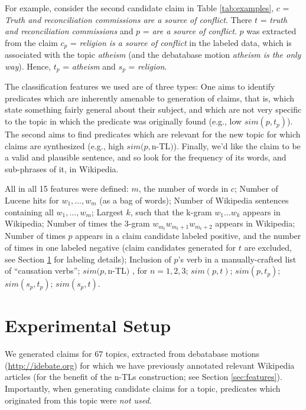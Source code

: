 \documentclass[11pt]{article}
\begin{document}
For example, consider the second candidate claim in Table \ref{tab:examples}, $c$ = \textit{Truth and reconciliation commissions are a source of conflict}. There $t$ = \textit{truth and reconciliation commissions} and $p$ = \textit{are a source of conflict}. $p$ was extracted from the claim $c_p$ = \textit{religion is a source of conflict} in the labeled data, which is associated with the topic \textit{atheism} (and the debatabase motion \textit{atheism is the only way}). Hence, $t_p$ = \textit{atheism} and $s_p$ = \textit{religion}. 

The classification features we used are of three types: One aims to identify predicates which are inherently 
amenable to generation of claims, that is, which state something fairly general about their subject, 
and which are not very specific to the topic in which the predicate was originally found %
(e.g., low $sim(p, t_p)$). The second aims to find predicates which are relevant for the new topic for which claims are synthesized %
(e.g., high $sim(p,$n-TL$)$). Finally, we'd like the claim to be a valid and plausible sentence, and so look for the frequency of its words, and sub-phrases of it, in Wikipedia.

All in all 15 features were defined: 
$m$, the number of words in $c$; 
Number of Lucene hits for $w_1, \ldots, w_m$ %
(as a bag of words);
Number of Wikipedia sentences containing all $w_1, \ldots, w_m$; %
Largest $k$, such that the k-gram $w_1 \ldots w_k$ appears in Wikipedia;
Number of times the 3-gram $w_{m_t} w_{m_t+1}  w_{m_t+2}$ appears in Wikipedia;
Number of times $p$ appears in a claim candidate labeled 
positive, and the number of times in one labeled negative 
(claim candidates generated for $t$ are excluded, see Section \ref{sec:setup} 
for labeling details); %
Inclusion of $p$'s verb in a manually-crafted list of ``causation verbs'';
$sim(p,$n-TL$)$ , for $n=1,2,3$;
$sim(p, t)$;
$sim(p, t_p)$;
$sim(s_p, t_p)$;
$sim(s_p, t)$.
      
\section{Experimental Setup}\label{sec:setup}
We generated claims for $67$ topics, extracted from debatabase motions (\url{http://idebate.org}) for which we have previously annotated relevant Wikipedia articles (for the benefit of the n-TLs construction; see Section \ref{sec:features}). Importantly, when generating candidate claims for a topic, predicates which originated from this topic were \textit{not used}.
\end{document}
